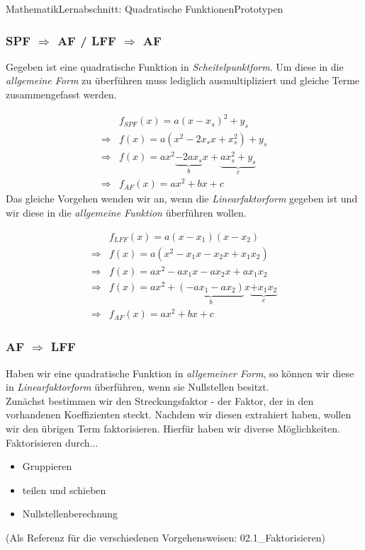 \documentclass[11pt,twocolumn,oneside,openany,headings=optiontotoc,11pt,numbers=noenddot]{article}
\begin{document}
\begin{worksheet}{Mathematik}{Lernabschnitt: Quadratische Funktionen}{Prototypen}
		\subsubsection*{SPF \(\Rightarrow\) AF / LFF \(\Rightarrow\) AF}
		Gegeben ist eine quadratische Funktion in \textit{Scheitelpunktform}. Um diese in die \textit{allgemeine Form} zu überführen muss lediglich ausmultipliziert und gleiche Terme zusammengefasst werden.\\
		\par\noindent
		\begin{align*}
			& f_{SPF}(x) = a(x-x_s)^2+y_s\\
			\Rightarrow & f(x) = a(x^2-2x_sx +x_s^2) + y_s\\
			\Rightarrow & f(x) = ax^2 \underbrace{-2ax_s}_{b}x + \underbrace{ax_s^2+y_s}_{c}\\
			\Rightarrow & f_{AF}(x) = ax^2+bx+c
		\end{align*}
		Das gleiche Vorgehen wenden wir an, wenn die \textit{Linearfaktorform} gegeben ist und wir diese in die \textit{allgemeine Funktion} überführen wollen.\\
		\par\noindent
		\begin{align*}
			& f_{LFF}(x) = a(x-x_1)(x-x_2)\\
			\Rightarrow & f(x) = a(x^2-x_1x - x_2x +x_1x_2)\\
			\Rightarrow & f(x) = ax^2-ax_1x - ax_2x +ax_1x_2\\
			\Rightarrow & f(x) = ax^2 + \underbrace{(-ax_1-ax_2)}_{b}x \underbrace{+x_1x_2}_{c}\\
			\Rightarrow & f_{AF}(x) = ax^2+bx+c
		\end{align*}
		\subsubsection*{AF \(\Rightarrow\) LFF}
		Haben wir eine quadratische Funktion in \textit{allgemeiner Form}, so können wir diese in \textit{Linearfaktorform} überführen, wenn sie Nullstellen besitzt.\\
		Zunächst bestimmen wir den Streckungsfaktor - der Faktor, der in den vorhandenen Koeffizienten steckt. Nachdem wir diesen \grq{}extrahiert\grq{} haben, wollen wir den übrigen Term faktorisieren. Hierfür haben wir diverse Möglichkeiten. Faktorisieren durch...
		\begin{itemize}
			\item Gruppieren
			\item teilen und schieben
			\item Nullstellenberechnung 
		\end{itemize}
		\tiny{(Als Referenz für die verschiedenen Vorgehensweisen: 02.1\_Faktorisieren)}
		\normalsize

\end{worksheet}
\end{document}
